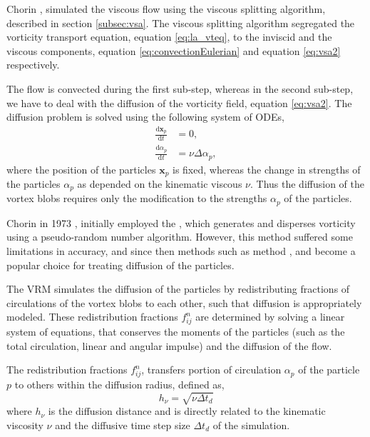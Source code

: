 Chorin \cite{Chorin1973a}, simulated the viscous flow using the viscous splitting algorithm, described in section \ref{subsec:vsa}. The viscous splitting algorithm segregated the vorticity transport equation, equation \ref{eq:la_vteq}, to the inviscid and the viscous components, equation \ref{eq:convectionEulerian} and equation \ref{eq:vsa2} respectively. 

The flow is convected during the first sub-step, whereas in the second sub-step, we have to deal with the diffusion of the vorticity field, equation \ref{eq:vsa2}. The diffusion problem is solved using the following system of ODEs, 
	\begin{subequations}
	\begin{align}
	\frac{\mathrm{d}\mathbf{x}_p}{\mathrm{d}t} &= 0,\\
	\frac{\mathrm{d}\alpha_p}{\mathrm{d}t} &= \nu\Delta\alpha_p,
	\end{align}
	\label{eq:la_sysODEsDiff}
	\end{subequations}
where the position of the particles $\mathbf{x}_p$ is fixed, whereas the change in strengths of the particles $\alpha_p$ as depended on the kinematic viscous $\nu$. Thus the diffusion of the vortex blobs requires only the modification to the strengths $\alpha_p$ of the particles. 

Chorin in 1973 \cite{Chorin1973a}, initially employed the , which generates and disperses vorticity using a pseudo-random number algorithm. However, this method suffered some limitations in accuracy, and since then methods such as  method \cite{Degond1989a}, and  \cite{Shankar1996} become a popular choice for treating diffusion of the particles.

The VRM simulates the diffusion of the particles by redistributing fractions of circulations of the vortex blobs to each other, such that diffusion is appropriately modeled. These redistribution fractions $f_{ij}^n$ are determined by solving a linear system of equations, that conserves the moments of the particles (such as the total circulation, linear and angular impulse) and the diffusion of the flow. 

The redistribution fractions $f_{ij}^n$, transfers portion of circulation $\alpha_p$ of the particle $p$ to others within the diffusion radius, defined as,
	\begin{equation}
	h_{\nu} = \sqrt{\nu\Delta t_d}
	\label{eq:la_diffDis}
	\end{equation}
where $h_{\nu}$ is the diffusion distance and is directly related to the kinematic viscosity $\nu$ and the diffusive time step size $\Delta t_d$ of the simulation.

